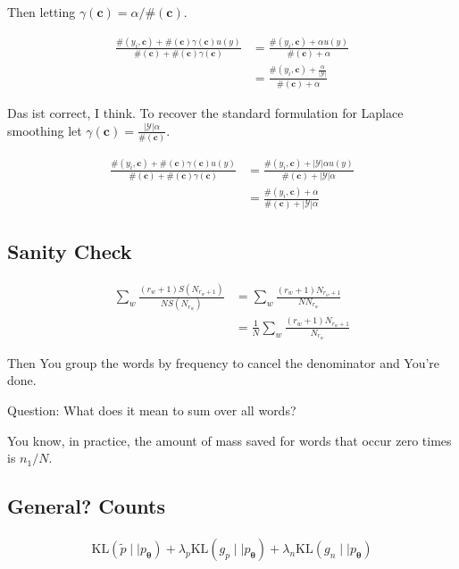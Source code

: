 \documentclass{article}
\newcommand{\KL}{\mathrm{KL}}
\newcommand{\vtheta}{\boldsymbol{\theta}}
\newcommand{\model}{p_{\vtheta}}
\newcommand{\context}{\boldsymbol{c}}
\begin{document}
			Then letting $\gamma(\context) = \alpha/\#(\context)$.
		
			\begin{align}
				\frac{\#(y_i, \context) +\#(\context)\gamma(\context)u(y)}{ \#(\context) + \#(\context)\gamma(\context)}	&= \frac{\#(y_i, \context) +\alpha u(y)}{ \#(\context) + \alpha}\\
				&= \frac{\#(y_i, \context) + \frac{\alpha}{|\mathcal{Y}|}}{ \#(\context) + \alpha}
			\end{align}
		
			Das ist correct, I think. To recover the standard formulation for Laplace smoothing let $\gamma(\context) = \frac{|\mathcal{Y}|\alpha}{\#(\context)}$.
		
			\begin{align}
				\frac{\#(y_i, \context) +\#(\context)\gamma(\context)u(y)}{ \#(\context) + \#(\context)\gamma(\context)}	&= \frac{\#(y_i, \context) +|\mathcal{Y}|\alpha u(y)}{ \#(\context) + |\mathcal{Y}|\alpha}\\
				&= \frac{\#(y_i, \context) + \alpha}{ \#(\context) + |\mathcal{Y}|\alpha}
			\end{align}
		
		
	\subsection{Sanity Check}
	
		\begin{align}
			\sum_w \frac{(r_w+1)S(N_{r_w+1})}{NS(N_{r_w})} &= \sum_w \frac{(r_w+1)N_{r_w+1}}{NN_{r_w}}\\
			&= \frac{1}{N}\sum_w \frac{(r_w+1)N_{r_w+1}}{N_{r_w}}
		\end{align}
		
		Then You group the words by frequency to cancel the denominator and You're done.
		
		Question: What does it mean to sum over all words?
		
		You know, in practice, the amount of mass saved for words that occur zero times is $n_1/N$.
		
	\subsection{General? Counts}
	
		\begin{align}
			\KL(\tilde{p}\mid\mid\model) + \lambda_p\KL(g_p\mid\mid\model) + \lambda_n\KL(g_n\mid\mid\model)
		\end{align}
		
\end{document}
